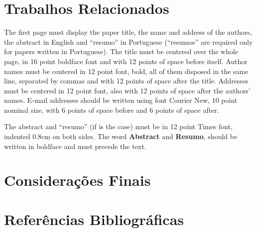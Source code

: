 \documentclass[12pt]{article}
\begin{document}
\section{Trabalhos Relacionados} 
\label{section:relacionados}

The first page must display the paper title, the name and address of the
authors, the abstract in English and ``resumo'' in Portuguese (``resumos'' are
required only for papers written in Portuguese). The title must be centered
over the whole page, in 16 point boldface font and with 12 points of space
before itself. Author names must be centered in 12 point font, bold, all of
them disposed in the same line, separated by commas and with 12 points of
space after the title. Addresses must be centered in 12 point font, also with
12 points of space after the authors' names. E-mail addresses should be
written using font Courier New, 10 point nominal size, with 6 points of space
before and 6 points of space after.

The abstract and ``resumo'' (if is the case) must be in 12 point Times font,
indented 0.8cm on both sides. The word \textbf{Abstract} and \textbf{Resumo},
should be written in boldface and must precede the text.


\section{Considerações Finais}
\label{section:consideracoes}

\section{Referências Bibliográficas}



\end{document}
